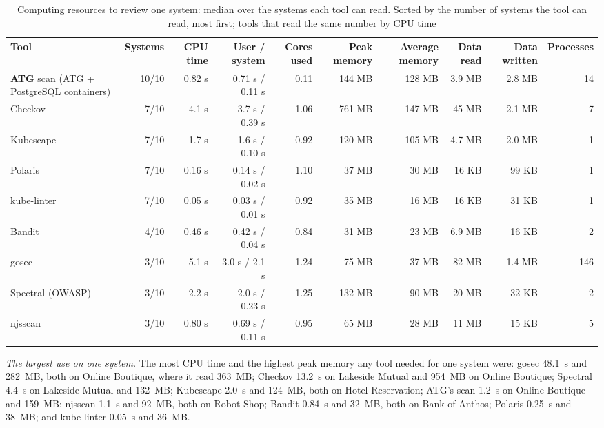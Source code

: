 \documentclass[conference]{IEEEtran}
\begin{document}
\begin{table}[!t]
\caption{Computing resources to review one system: median over the systems each tool can read. Sorted by the number of systems the tool can read, most first; tools that read the same number by CPU time}
\label{tab:cost}
\centering
\scriptsize
\setlength{\tabcolsep}{3.5pt}
\begin{tabular}{@{}>{\raggedright\arraybackslash}p{3.3cm}rrrrrrrrr@{}}
\toprule
Tool & Systems & CPU time & User / system & Cores used & Peak memory & Average memory & Data read & Data written & Processes \\
\midrule
\textbf{ATG} scan (ATG + PostgreSQL containers) & 10/10 & 0.82 s & 0.71 s / 0.11 s & 0.11 & 144 MB & 128 MB & 3.9 MB & 2.8 MB & 14 \\
Checkov & 7/10 & 4.1 s & 3.7 s / 0.39 s & 1.06 & 761 MB & 147 MB & 45 MB & 2.1 MB & 7 \\
Kubescape & 7/10 & 1.7 s & 1.6 s / 0.10 s & 0.92 & 120 MB & 105 MB & 4.7 MB & 2.0 MB & 1 \\
Polaris & 7/10 & 0.16 s & 0.14 s / 0.02 s & 1.10 & 37 MB & 30 MB & 16 KB & 99 KB & 1 \\
kube-linter & 7/10 & 0.05 s & 0.03 s / 0.01 s & 0.92 & 35 MB & 16 MB & 16 KB & 31 KB & 1 \\
Bandit & 4/10 & 0.46 s & 0.42 s / 0.04 s & 0.84 & 31 MB & 23 MB & 6.9 MB & 16 KB & 2 \\
gosec & 3/10 & 5.1 s & 3.0 s / 2.1 s & 1.24 & 75 MB & 37 MB & 82 MB & 1.4 MB & 146 \\
Spectral (OWASP) & 3/10 & 2.2 s & 2.0 s / 0.23 s & 1.25 & 132 MB & 90 MB & 20 MB & 32 KB & 2 \\
njsscan & 3/10 & 0.80 s & 0.69 s / 0.11 s & 0.95 & 65 MB & 28 MB & 11 MB & 15 KB & 5 \\
\bottomrule
\end{tabular}
\end{table}

\textit{The largest use on one system.} The most CPU time and the highest peak memory any tool needed for one system were: gosec 48.1~s and 282~MB, both on Online Boutique, where it read 363~MB; Checkov 13.2~s on Lakeside Mutual and 954~MB on Online Boutique; Spectral 4.4~s on Lakeside Mutual and 132~MB; Kubescape 2.0~s and 124~MB, both on Hotel Reservation; ATG's scan 1.2~s on Online Boutique and 159~MB; njsscan 1.1~s and 92~MB, both on Robot Shop; Bandit 0.84~s and 32~MB, both on Bank of Anthos; Polaris 0.25~s and 38~MB; and kube-linter 0.05~s and 36~MB.
\end{document}
